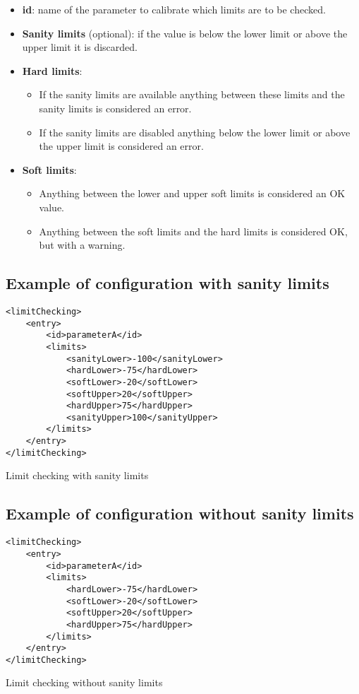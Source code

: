 \begin{itemize}
\item \textbf{id}: name of the parameter to calibrate which limits are to be checked.
\item \textbf{Sanity limits} (optional): if the value is below the lower limit or above the upper limit it is discarded. 
\item \textbf{Hard limits}:
	\begin{itemize}
	\item If the sanity limits are available anything between these limits and the sanity limits is considered an error.
	\item If the sanity limits are disabled anything below the lower limit or above the upper limit is considered an error. 
	\end{itemize}
\item \textbf{Soft limits}: 
\begin{itemize}
\item Anything between the lower and upper soft limits is considered an OK value.
\item Anything between the soft limits and the hard limits is considered OK, but with a warning.
\end{itemize}
\end{itemize}

\subsection{Example of configuration with sanity limits}

\begin{table}[H]
\lstset{language=XML}
\begin{lstlisting}
<limitChecking>
	<entry>
		<id>parameterA</id>
		<limits>
			<sanityLower>-100</sanityLower>
			<hardLower>-75</hardLower>
			<softLower>-20</softLower>
			<softUpper>20</softUpper>
			<hardUpper>75</hardUpper>
			<sanityUpper>100</sanityUpper>
		</limits>
	</entry>
</limitChecking>
\end{lstlisting}
\caption{Limit checking with sanity limits}
\label{Table5.12}
\end{table}

\subsection{Example of configuration without sanity limits}

\begin{table}[H]
\lstset{language=XML}
\begin{lstlisting}
<limitChecking>
	<entry>
		<id>parameterA</id>
		<limits>
			<hardLower>-75</hardLower>
			<softLower>-20</softLower>
			<softUpper>20</softUpper>
			<hardUpper>75</hardUpper>
		</limits>
	</entry>
</limitChecking>
\end{lstlisting}
\caption{Limit checking without sanity limits}
\label{Table5.13}
\end{table}
